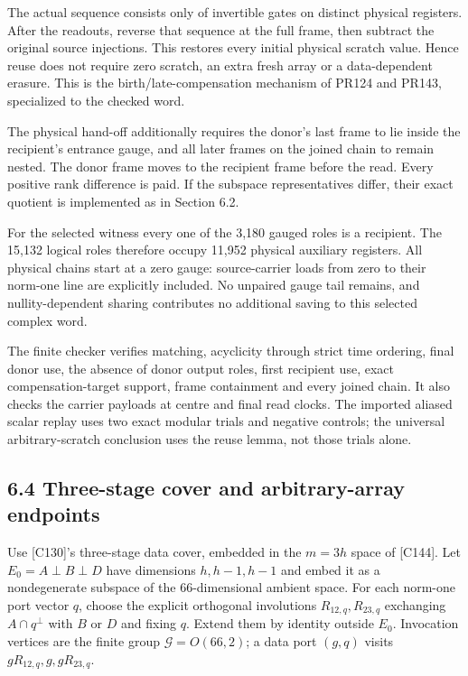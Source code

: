 \documentclass[
  11pt,
]{article}
\begin{document}
The actual sequence consists only of invertible gates on distinct
physical registers. After the readouts, reverse that sequence at the
full frame, then subtract the original source injections. This restores
every initial physical scratch value. Hence reuse does not require zero
scratch, an extra fresh array or a data-dependent erasure. This is the
birth/late-compensation mechanism of PR124 and PR143, specialized to the
checked word.

The physical hand-off additionally requires the donor's last frame to
lie inside the recipient's entrance gauge, and all later frames on the
joined chain to remain nested. The donor frame moves to the recipient
frame before the read. Every positive rank difference is paid. If the
subspace representatives differ, their exact quotient is implemented as
in Section 6.2.

For the selected witness every one of the 3,180 gauged roles is a
recipient. The 15,132 logical roles therefore occupy 11,952 physical
auxiliary registers. All physical chains start at a zero gauge:
source-carrier loads from zero to their norm-one line are explicitly
included. No unpaired gauge tail remains, and nullity-dependent sharing
contributes no additional saving to this selected complex word.

The finite checker verifies matching, acyclicity through strict time
ordering, final donor use, the absence of donor output roles, first
recipient use, exact compensation-target support, frame containment and
every joined chain. It also checks the carrier payloads at centre and
final read clocks. The imported aliased scalar replay uses two exact
modular trials and negative controls; the universal arbitrary-scratch
conclusion uses the reuse lemma, not those trials alone.

\subsection{6.4 Three-stage cover and arbitrary-array
endpoints}\label{three-stage-cover-and-arbitrary-array-endpoints}

Use {[}C130{]}'s three-stage data cover, embedded in the \(m=3h\) space
of {[}C144{]}. Let \(E_0=A\perp B\perp D\) have dimensions \(h,h-1,h-1\)
and embed it as a nondegenerate subspace of the 66-dimensional ambient
space. For each norm-one port vector \(q\), choose the explicit
orthogonal involutions \(R_{12,q},R_{23,q}\) exchanging
\(A\cap q^\perp\) with \(B\) or \(D\) and fixing \(q\). Extend them by
identity outside \(E_0\). Invocation vertices are the finite group
\(\mathcal G=O(66,2)\); a data port \((g,q)\) visits
\(gR_{12,q},g,gR_{23,q}\).
\end{document}
